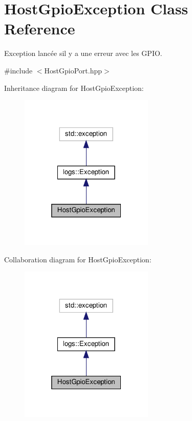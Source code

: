 \hypertarget{classHostGpioException}{}\section{Host\+Gpio\+Exception Class Reference}
\label{classHostGpioException}


Exception lancée s\textquotesingle{}il y a une erreur avec les G\+P\+IO.  




{\ttfamily \#include $<$Host\+Gpio\+Port.\+hpp$>$}



Inheritance diagram for Host\+Gpio\+Exception\+:
\nopagebreak
\begin{figure}[H]
\begin{center}
\leavevmode
\includegraphics[width=181pt]{classHostGpioException__inherit__graph}
\end{center}
\end{figure}


Collaboration diagram for Host\+Gpio\+Exception\+:
\nopagebreak
\begin{figure}[H]
\begin{center}
\leavevmode
\includegraphics[width=181pt]{classHostGpioException__coll__graph}
\end{center}
\end{figure}

